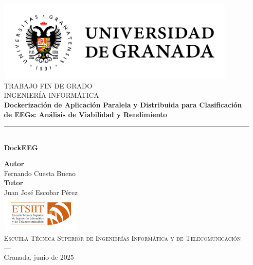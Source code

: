 \begin{titlepage}


    \newlength{\centeroffset}
    \setlength{\centeroffset}{-0.5\oddsidemargin}
    \addtolength{\centeroffset}{0.5\evensidemargin}
    \thispagestyle{empty}

    \noindent\hspace*{\centeroffset}\begin{minipage}{\textwidth}

        \centering
        \includegraphics[width=0.9\textwidth]{imagenes/logo_ugr.jpg}\\[1.2cm]

        \textsc{ \Large TRABAJO FIN DE GRADO\\[0.2cm]}
        \textsc{INGENIERÍA INFORMÁTICA}\\[1cm]
        {\LARGE\bfseries Dockerización de Aplicación Paralela y Distribuida para Clasificación de EEGs: Análisis de Viabilidad y Rendimiento\\
        }
        \noindent\rule[-1ex]{\textwidth}{3pt}\\[3.5ex]
        {\large\bfseries DockEEG}
    \end{minipage}

    \vspace{1.5cm}
    \noindent\hspace*{\centeroffset}\begin{minipage}{\textwidth}
        \centering

        \textbf{Autor}\\ {Fernando Cuesta Bueno}\\[2.5ex]
        \textbf{Tutor}\\
        {Juan José Escobar Pérez}\\[2cm]
        \includegraphics[width=0.3\textwidth]{imagenes/etsiit_logo.png}\\[0.1cm]
        \textsc{Escuela Técnica Superior de Ingenierías Informática y de Telecomunicación}\\
        \textsc{---}\\
        Granada, junio de 2025
    \end{minipage}
\end{titlepage}